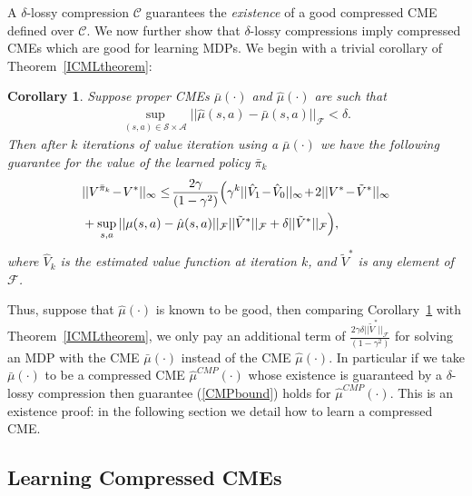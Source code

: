 \documentclass[letterpaper]{article}
\newtheorem{corollary}[theorem]{Corollary}
\newcommand{\cC}{{\mathcal C}}
\newcommand{\cF}{{\mathcal F}}
\newcommand{\cA}{{\mathcal A}}
\newcommand{\cS}{{\mathcal S}}
\newcommand{\nn}{\nonumber}
\begin{document}
A $\delta$-lossy compression $\cC$ guarantees the \emph{existence} of a good compressed CME defined over $\cC$. We now further show that $\delta$-lossy compressions imply compressed CMEs which are good for learning MDPs. We begin with a trivial corollary of Theorem~\ref{ICMLtheorem}:

\begin{corollary} \label{ICMLcorollary}
Suppose proper CMEs $\bar\mu(\cdot)$ and $\hat\mu(\cdot)$ are such that
\begin{align}
\sup_{(s,a)\in\cS\times\cA}||\hat\mu(s,a) - \bar\mu(s,a)||_\cF < \delta.
\end{align}
Then after $k$ iterations of value iteration using a  $\bar\mu(\cdot)$ we have the following guarantee for the value of the learned policy $\bar\pi_k$
\begin{align}
&||V^{\bar\pi_k} \hspace{-0.5mm}-\hspace{-0.5mm} V^*||_{\infty}\le \hspace{-0.5mm} \frac{2\gamma}{(1-\gamma^2)}\Big( \gamma^k ||\hat V_1\hspace{-0.5mm} -\hspace{-0.5mm} \hat V_0||_{\infty} \hspace{-0.5mm}+\hspace{-0.5mm} 2|| V^* \hspace{-0.5mm}- \hspace{-0.5mm}\tilde V^* ||_{\infty}  \nn\\
&+\sup_{s,a} ||\mu(s,a) - \hat\mu(s,a)||_{\cF}||\tilde V^*||_{\cF} + \delta||\tilde V^*||_{\cF} \Big), \label{CMPbound}
\end{align}
where $\hat V_k$ is the estimated value function at iteration $k$, and $\tilde V^*$ is any element of $\cF$.
\end{corollary}
Thus, suppose that $\hat\mu(\cdot)$ is known to be good, then comparing Corollary~\ref{ICMLcorollary} with Theorem~\ref{ICMLtheorem}, we only pay an additional term of $\frac{2\gamma \delta||\tilde V^*||_{\cF}}{(1-\gamma^2)}$ for solving an MDP with the CME $\bar\mu(\cdot)$ instead of the CME $\hat\mu(\cdot)$. In particular if we take $\bar\mu(\cdot)$ to be a compressed CME $\hat \mu^{CMP}(\cdot)$ whose existence is guaranteed by a $\delta$-lossy compression then guarantee (\ref{CMPbound}) holds for $\hat \mu^{CMP}(\cdot)$. This is an existence proof: in the following section we detail how to learn a compressed CME.

\subsection{Learning Compressed CMEs} \label{LearningCompressedModel}
\end{document}
